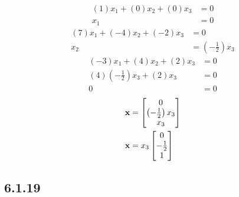 \documentclass{article}
\begin{document}
\begin{align*}
	(1)x_1 + (0)x_2 + (0)x_3 & = 0 \\
	x_1 & = 0
\end{align*}
\begin{align*}
	(7)x_1 + (-4)x_2 + (-2)x_3 & = 0 \\
	x_2 & = \left( -\frac{1}{2} \right) x_3
\end{align*}
\begin{align*}
	(-3)x_1 + (4)x_2 + (2)x_3 & = 0 \\
	(4) \left( -\frac{1}{2} \right) x_3 + (2)x_3 & = 0 \\
	0 & = 0
\end{align*}
\begin{align*}
	\vect{x} & = \begin{bmatrix} 0 \\ \left( -\frac{1}{2} \right) x_3 \\ x_3 \end{bmatrix} \\
	\vect{x} & = x_3 \begin{bmatrix} 0 \\ -\frac{1}{2} \\ 1 \end{bmatrix}
\end{align*}

\subsection{6.1.19}
\end{document}
